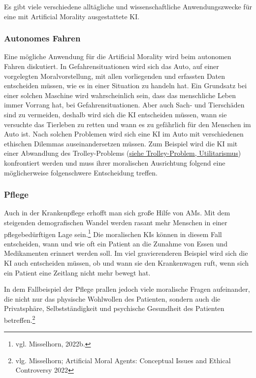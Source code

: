 Es gibt viele verschiedene alltägliche und wissenschaftliche Anwendungszwecke für eine mit Artificial Morality ausgestattete KI\@.

\subsubsection{Autonomes Fahren}\label{subsubsec::autonomes fahren}

Eine mögliche Anwendung für die Artificial Morality wird beim autonomen Fahren diskutiert.
In Gefahrensituationen wird sich das Auto, auf einer vorgelegten Moralvorstellung, mit allen vorliegenden und erfassten
Daten entscheiden müssen, wie es in einer Situation zu handeln hat.
Ein Grundsatz bei einer solchen Maschine wird wahrscheinlich sein, dass das menschliche Leben immer Vorrang hat, bei
Gefahrensituationen.
Aber auch Sach- und Tierschäden sind zu vermeiden, deshalb wird sich die KI entscheiden müssen, wann sie versuchte das
Tierleben zu retten und wann es zu gefährlich für den Menschen im Auto ist.
Nach solchen Problemen wird sich eine KI im Auto mit verschiedenen ethischen Dilemmas auseinandersetzen müssen.
Zum Beispiel wird die KI mit einer Abwandlung des Trolley-Problems (\hyperlink{Trolley-Problem}{siehe Trolley-Problem, Utilitarismus}) konfrontiert werden und muss ihrer moralischen Ausrichtung
folgend eine möglicherweise folgenschwere Entscheidung treffen.

\subsubsection{Pflege}\label{subsubsec::pflege}

Auch in der Krankenpflege erhofft man sich große Hilfe von AMs. Mit dem steigenden demografischen Wandel werden rasant mehr
Menschen in einer pflegebedürftigen Lage sein.\footnote{vgl. Misselhorn, 2022b.}
Die moralischen KIs können in diesem Fall entscheiden, wann und wie oft ein Patient an die Zunahme von Essen und Medikamenten
erinnert werden soll.
Im viel gravierenderen Beispiel wird sich die KI auch entscheiden müssen, ob und wann sie den Krankenwagen ruft, wenn sich ein
Patient eine Zeitlang nicht mehr bewegt hat.

In dem Fallbeispiel der Pflege prallen jedoch viele moralische Fragen aufeinander, die nicht nur das physische Wohlwollen des Patienten,
sondern auch die Privatsphäre, Selbstständigkeit und psychische Gesundheit des Patienten betreffen.\footnote{vlg. Misselhorn; Artificial Moral Agents: Conceptual Issues and Ethical Controversy 2022}

